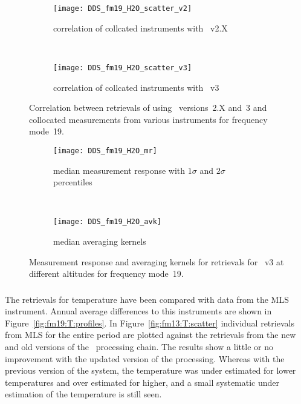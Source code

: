 \begin{figure}[htpb]
    \centering
    \begin{subfigure}[b]{0.49\textwidth}
        \texttt{[image: DDS\_fm19\_H2O\_scatter\_v2]}
        \caption{correlation of collcated instruments with \smr~v2.X}
        \label{fig:fm19:H2O:scatter:v2}
    \end{subfigure}
    \,
    \begin{subfigure}[b]{0.49\textwidth}
        \texttt{[image: DDS\_fm19\_H2O\_scatter\_v3]}
        \caption{correlation of collcated instruments with \smr~v3}
        \label{fig:fm19:H2O:scatter:v3}
    \end{subfigure}
    \caption{Correlation between retrievals of  using \smr\
    versions~2.X and~3 and collocated measurements from various instruments
    for frequency mode~19.}
    \label{fig:fm19:H2O:scatter}
\end{figure}

\begin{figure}[htpb]
    \centering
    \begin{subfigure}[b]{0.49\textwidth}
        \texttt{[image: DDS\_fm19\_H2O\_mr]}
        \caption{median measurement response with $1\sigma$ and $2\sigma$
        percentiles}
        \label{fig:fm19:H2O:mr}
    \end{subfigure}
    \,
    \begin{subfigure}[b]{0.49\textwidth}
        \texttt{[image: DDS\_fm19\_H2O\_avk]}
        \caption{median averaging kernels\newline~}
        \label{fig:fm19:H2O:avk}
    \end{subfigure}
    \caption{Measurement response and averaging kernels for 
    retrievals for \smr~v3 at different altitudes for frequency mode~19.}
    \label{fig:fm19:H2O:mr_avk}
\end{figure}



\subsubsection{}
\label{sec:fm19:comparison:temperature}
The retrievals for temperature have been compared with data from the MLS
instrument. Annual average differences to this instruments are shown in
Figure~\ref{fig:fm19:T:profiles}. In Figure~\ref{fig:fm13:T:scatter} individual
retrievals from MLS for the entire period are plotted against the retrievals
from the new and old versions of the \smr\ processing chain. The results show a
little or no improvement with the updated version of the processing. Whereas
with the previous version of the system, the temperature was under estimated
for lower temperatures and over estimated for higher, and a small systematic
under estimation of the temperature is still seen.

